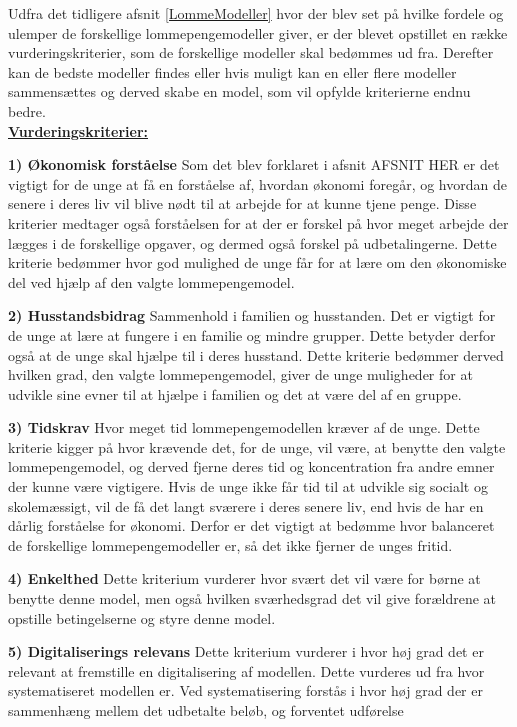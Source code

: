 Udfra det tidligere afsnit \ref{LommeModeller}  hvor der blev set på hvilke fordele og ulemper de forskellige lommepengemodeller giver, er der blevet opstillet en række vurderingskriterier, som de forskellige modeller skal bedømmes ud fra. Derefter kan de bedste modeller findes eller hvis muligt kan en eller flere modeller sammensættes og derved skabe en model, som vil opfylde kriterierne endnu bedre.\\

\noindent \uline{\textbf{Vurderingskriterier:}}

\textbf{1) Økonomisk forståelse}
Som det blev forklaret i afsnit AFSNIT HER er det vigtigt for de unge at få en forståelse af, hvordan økonomi foregår, og hvordan de senere i deres liv vil blive nødt til at arbejde for at kunne tjene penge. 
Disse kriterier medtager også forståelsen for at der er forskel på hvor meget arbejde der lægges i de forskellige opgaver, og dermed også forskel på udbetalingerne.
Dette kriterie bedømmer hvor god mulighed de unge får for at lære om den økonomiske del ved hjælp af den valgte lommepengemodel.

\textbf{2) Husstandsbidrag}
Sammenhold i familien og husstanden. 
Det er vigtigt for de unge at lære at fungere i en familie og mindre grupper. Dette betyder derfor også at de unge skal hjælpe til i deres husstand.
Dette kriterie bedømmer derved hvilken grad, den valgte lommepengemodel, giver de unge muligheder for at udvikle sine evner til at hjælpe i familien og det at være del af en gruppe.

\textbf{3) Tidskrav}
Hvor meget tid lommepengemodellen kræver af de unge.
Dette kriterie kigger på hvor krævende det, for de unge, vil være, at benytte den valgte lommepengemodel, og derved fjerne deres tid og koncentration fra andre emner der kunne være vigtigere. Hvis de unge ikke får tid til at udvikle sig socialt og skolemæssigt, vil de få det langt sværere i deres senere liv, end hvis de har en dårlig forståelse for økonomi.
Derfor er det vigtigt at bedømme hvor balanceret de forskellige lommepengemodeller er, så det ikke fjerner de unges fritid.

\textbf{4) Enkelthed}
Dette kriterium vurderer hvor svært det vil være for børne at benytte denne model, men også hvilken sværhedsgrad det vil give forældrene at opstille betingelserne og styre denne model.

\textbf{5) Digitaliserings relevans}
Dette kriterium vurderer i hvor høj grad det er relevant at fremstille en digitalisering af modellen. Dette vurderes ud fra hvor systematiseret modellen er. Ved systematisering forstås i hvor høj grad der er sammenhæng mellem det udbetalte beløb, og forventet udførelse%

